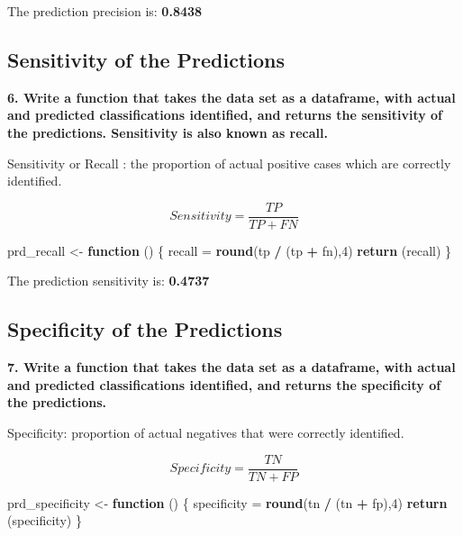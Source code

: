 \documentclass[]{article}
\newenvironment{Shaded}{\begin{snugshade}}{\end{snugshade}}
\newcommand{\ControlFlowTok}[1]{\textcolor[rgb]{0.13,0.29,0.53}{\textbf{#1}}}
\newcommand{\DecValTok}[1]{\textcolor[rgb]{0.00,0.00,0.81}{#1}}
\newcommand{\KeywordTok}[1]{\textcolor[rgb]{0.13,0.29,0.53}{\textbf{#1}}}
\newcommand{\NormalTok}[1]{#1}
\newcommand{\OperatorTok}[1]{\textcolor[rgb]{0.81,0.36,0.00}{\textbf{#1}}}
\newcommand{\StringTok}[1]{\textcolor[rgb]{0.31,0.60,0.02}{#1}}
\begin{document}
The prediction precision is: \textbf{0.8438}

\hypertarget{sensitivity-of-the-predictions}{%
\subsection{Sensitivity of the
Predictions}\label{sensitivity-of-the-predictions}}

\textbf{6. Write a function that takes the data set as a dataframe, with
actual and predicted classifications identified, and returns the
sensitivity of the predictions. Sensitivity is also known as recall. }

Sensitivity or Recall : the proportion of actual positive cases which
are correctly identified.

\[Sensitivity = \frac {TP}{TP + FN}\]

\begin{Shaded}
\begin{Highlighting}[]
\NormalTok{prd_recall <-}\StringTok{ }\ControlFlowTok{function}\NormalTok{ () \{}
\NormalTok{    recall =}\StringTok{ }\KeywordTok{round}\NormalTok{(tp }\OperatorTok{/}\StringTok{ }\NormalTok{(tp }\OperatorTok{+}\StringTok{ }\NormalTok{fn),}\DecValTok{4}\NormalTok{)}
    \KeywordTok{return}\NormalTok{ (recall)}
\NormalTok{\}}
\end{Highlighting}
\end{Shaded}

The prediction sensitivity is: \textbf{0.4737}

\hypertarget{specificity-of-the-predictions}{%
\subsection{Specificity of the
Predictions}\label{specificity-of-the-predictions}}

\textbf{7. Write a function that takes the data set as a dataframe, with
actual and predicted classifications identified, and returns the
specificity of the predictions.}

Specificity: proportion of actual negatives that were correctly
identified.

\[Specificity = \frac {TN}{TN + FP}\]

\begin{Shaded}
\begin{Highlighting}[]
\NormalTok{prd_specificity <-}\StringTok{ }\ControlFlowTok{function}\NormalTok{ () \{}
\NormalTok{    specificity =}\StringTok{ }\KeywordTok{round}\NormalTok{(tn }\OperatorTok{/}\StringTok{ }\NormalTok{(tn }\OperatorTok{+}\StringTok{ }\NormalTok{fp),}\DecValTok{4}\NormalTok{)}
    \KeywordTok{return}\NormalTok{ (specificity)}
\NormalTok{\}}
\end{Highlighting}
\end{Shaded}
\end{document}

